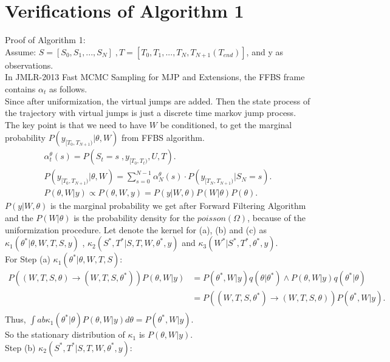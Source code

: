 \section{Verifications of Algorithm 1}
\label{sec:verify}
Proof of Algorithm 1:\\
\noindent Assume: $S = [S_0,S_1, ...,S_N] \;, T = [T_0, T_1,...,T_N, T_{N+1}(T_{end})]$, and y as observations.\\
In JMLR-2013 Fast MCMC Sampling for MJP and Extensions, the FFBS frame contains $\alpha_t$ as follows.\\
Since after uniformization, the virtual jumps are added.  Then the state process of the trajectory with virtual jumps is just a discrete time markov jump process. The key point is that we need to have $W$ be conditioned, to get the marginal probability $P(y_{[T_0, T_{N + 1})} | \theta, W)$ from FFBS algorithm. \\
\begin{align*}
\alpha^\theta_t(s) = P(S_t = s\;, y_{[T_0, T_t)}, U, T).\\
P(y_{[T_0, T_{N + 1})} | \theta, W) = \sum_{s = 0}^{N-1} \alpha^\theta_N(s) \cdot P(y_{[T_N, T_{N+1})} | S_N = s).\\
P(\theta, W| y) \propto P(\theta, W, y) = P(y| W, \theta) P(W | \theta) P(\theta).
\end{align*}
$P(y|W, \theta)$ is the marginal probability we get after Forward Filtering Algorithm and the $P(W | \theta)$ is the probability density for the $poisson(\Omega)$, because of the uniformization procedure.
Let denote the kernel for (a), (b) and (c) as  $\kappa_1(\theta^*| \theta, W, T, S, y)$ , $\kappa_2(S^*, T^*|S, T, W, \theta^*, y)$ and $\kappa_3(W^*| S^*, T^*, \theta^*, y)$.\\
For Step (a) $\kappa_1(\theta^*| \theta, W, T, S)$:\\
 \begin{align*} 
P((W, T, S, \theta) \rightarrow (W, T, S, \theta^*)) P(\theta, W | y) &=  P(\theta^*, W | y)q(\theta | \theta^*)
 \wedge P(\theta, W|y) q(\theta^*| \theta) \\&= P((W, T, S,\theta^*) \rightarrow (W, T, S,\theta)) P(\theta^*, W | y).\\
\end{align*}
Thus, $  \int ab \kappa_1(\theta^*| \theta) P(\theta, W|y) d\theta = P(\theta^*, W |y). $\\
So the stationary distribution of $\kappa_1$ is $P(\theta, W | y)$.\\
Step (b) $\kappa_2(S^*, T^*|S, T, W, \theta^*, y)$: \\ 
